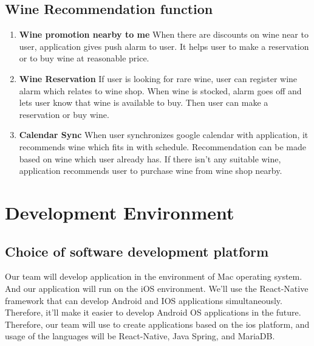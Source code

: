 \documentclass[sigconf, nonacm]{acmart}
\begin{document}
\subsection{Wine Recommendation function}
\begin{enumerate}
\item \textbf{Wine promotion nearby to me}
When there are discounts on wine near to user, application gives push alarm to user. It helps user to make a reservation or to buy wine at reasonable price.\\

\item \textbf{Wine Reservation}
If user is looking for rare wine, user can register wine alarm which relates to wine shop. When wine is stocked, alarm goes off and lets user know that wine is available to buy. Then user can make a reservation or buy wine.\\

\item \textbf{Calendar Sync}
When user synchronizes google calendar with application, it recommends wine which fits in with schedule. Recommendation can be made based on wine which user already has. If there isn't any suitable wine, application recommends user to purchase wine from wine shop nearby.\\
\end{enumerate}
\section{Development Environment}
\noindent \subsection{Choice of software development platform}

\indent Our team will develop application in the environment of Mac operating system. And our application will run on the iOS environment. We'll use the React-Native framework that can develop Android and IOS applications simultaneously. Therefore, it'll make it easier to develop Android OS applications in the future. Therefore, our team will use to create applications based on the ios platform, and usage of the languages will be React-Native, Java Spring, and MariaDB.\\ \\
\end{document}
